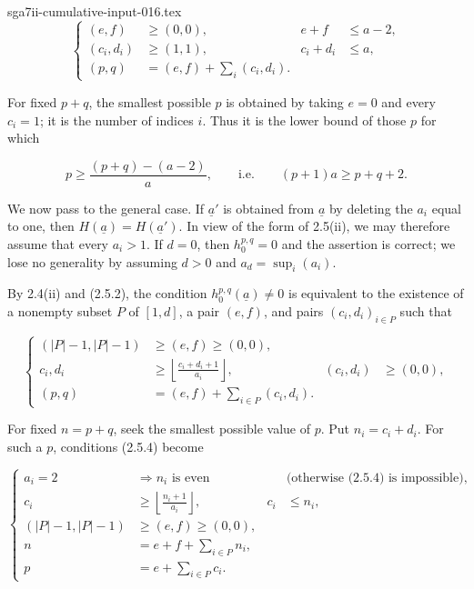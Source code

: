 \begin{filecontents*}{sga7ii-cumulative-input-016.tex}
\begin{equation}\tag{2.5.3}
\left\{
\begin{aligned}
(e,f)&\geq(0,0),& e+f&\leq a-2,\\
(c_i,d_i)&\geq(1,1),& c_i+d_i&\leq a,\\
(p,q)&=(e,f)+\sum_i(c_i,d_i).&&
\end{aligned}
\right.
\end{equation}


For fixed $p+q$, the smallest possible $p$ is obtained by taking $e=0$
and every $c_i=1$; it is the number of indices $i$.  Thus it is the lower
bound of those $p$ for which

\begin{equation*}
p\geq\frac{(p+q)-(a-2)}{a},
\qquad\text{i.e.}\qquad (p+1)a\geq p+q+2.
\end{equation*}

We now pass to the general case.  If $\underline a'$ is obtained from
$\underline a$ by deleting the $a_i$ equal to one, then
$H(\underline a)=H(\underline a')$.  In view of the form of 2.5(ii), we may
therefore assume that every $a_i>1$.  If $d=0$, then
$h_0^{p,q}=0$ and the assertion is correct; we lose no generality by
assuming $d>0$ and $a_d=\sup_i(a_i)$.

By 2.4(ii) and (2.5.2), the condition
$h_0^{p,q}(\underline a)\ne0$ is equivalent to the existence of a nonempty
subset $P$ of $[1,d]$, a pair $(e,f)$, and pairs
$(c_i,d_i)_{i\in P}$ such that

\begin{equation}\tag{2.5.4}
\left\{
\begin{aligned}
(|P|-1,|P|-1)&\geq(e,f)\geq(0,0),\\
c_i,d_i&\geq
\left\lfloor\frac{c_i+d_i+1}{a_i}\right\rfloor,
& (c_i,d_i)&\geq(0,0),\\
(p,q)&=(e,f)+\sum_{i\in P}(c_i,d_i).&&
\end{aligned}
\right.
\end{equation}

For fixed $n=p+q$, seek the smallest possible value of $p$.  Put
$n_i=c_i+d_i$.  For such a $p$, conditions (2.5.4) become


\begin{equation}\tag{2.5.5}
\left\{
\begin{aligned}
a_i=2&\Longrightarrow n_i\text{ is even}
&&\text{(otherwise (2.5.4) is impossible)},\\
c_i&\geq\left\lfloor\frac{n_i+1}{a_i}\right\rfloor,
&c_i&\leq n_i,\\
(|P|-1,|P|-1)&\geq(e,f)\geq(0,0),&&\\
n&=e+f+\sum_{i\in P}n_i,&&\\
p&=e+\sum_{i\in P}c_i.&&
\end{aligned}
\right.
\end{equation}


\end{filecontents*}
